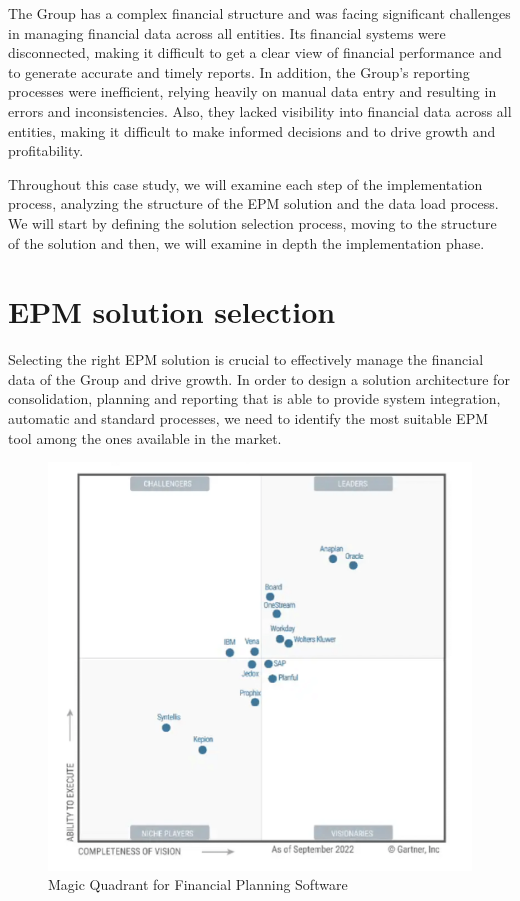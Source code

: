 \documentclass[12pt,a4paper,openright,twoside]{book}
\begin{document}
The Group has a complex financial structure and was facing significant challenges in managing financial data across all entities. 
%
Its financial systems were disconnected, making it difficult to get a clear view of financial performance and to generate accurate and timely reports. 
%
In addition, the Group's reporting processes were inefficient, relying heavily on manual data entry and resulting in errors and inconsistencies. 
%
Also, they lacked visibility into financial data across all entities, making it difficult to make informed decisions and to drive growth and profitability.

Throughout this case study, we will examine each step of the implementation process, analyzing the structure of the EPM solution and the data load process.
%
We will start by defining the solution selection process, moving to the structure of the solution and then, we will examine in depth the implementation phase.

\section{EPM solution selection}

Selecting the right EPM solution is crucial to effectively manage the financial data of the Group and drive growth.
%
In order to design a solution architecture for consolidation, planning and reporting that is able to provide system integration, automatic and standard processes, we need to identify the most suitable EPM tool among the ones available in the market.

\begin{figure}[htbp]
	\centering
	\includegraphics[width=\linewidth]{figures/gartner.pdf}
	\caption{Magic Quadrant for Financial Planning Software}
	\label{fig:gartner}
\end{figure}
\end{document}
